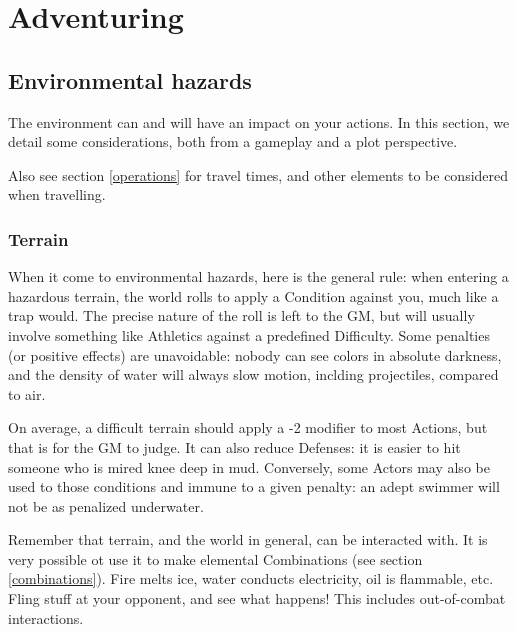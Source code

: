 
\chapter{Adventuring}

\section{Environmental hazards}

\label{hazards}


The environment can and will have an impact on your actions. In this section, we detail some considerations, both from a gameplay and a plot perspective.



\begin{rpg-examplebox}
	Also see section \ref{operations} for travel times, and other elements to be considered when travelling.
\end{rpg-examplebox}


\subsection{Terrain}

When it come to environmental hazards, here is the general rule: when entering a hazardous terrain, the world rolls to apply a Condition against you, much like a trap would. The precise nature of the roll is left to the GM, but will usually involve something like Athletics against a predefined Difficulty. Some penalties (or positive effects) are unavoidable: nobody can see colors in absolute darkness, and the density of water will always slow motion, inclding projectiles, compared to air. 

On average, a difficult terrain should apply a -2 modifier to most Actions, but that is for the GM to judge. It can also reduce Defenses: it is easier to hit someone who is mired knee deep in mud. Conversely, some Actors may also be used to those conditions and immune to a given penalty: an adept swimmer will not be as penalized underwater.

Remember that terrain, and the world in general, can be interacted with. It is very possible ot use it to make elemental Combinations (see section \ref{combinations}). Fire melts ice, water conducts electricity, oil is flammable, etc. Fling stuff at your opponent, and see what happens! This includes out-of-combat interactions.

